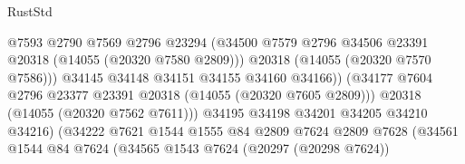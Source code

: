 \begin{lexlean}{RustStd}
\begin{coremodule}
                                              @7593
                                              @2790
                                              @7569
                                              @2796
                                              @23294
                                              (@34500
                                                @7579
                                                @2796
                                                @34506
                                                @23391
                                                @20318
                                                (@14055 (@20320 @7580 @2809)))
                                              @20318
                                              (@14055 (@20320 @7570 @7586)))
                                            @34145
                                            @34148
                                            @34151
                                            @34155
                                            @34160
                                            @34166))
                                        (@34177
                                          @7604
                                          @2796
                                          @23377
                                          @23391
                                          @20318
                                          (@14055 (@20320 @7605 @2809)))
                                        @20318
                                        (@14055 (@20320 @7562 @7611)))
                                      @34195
                                      @34198
                                      @34201
                                      @34205
                                      @34210
                                      @34216)
                                    (@34222
                                      @7621
                                      @1544
                                      @1555
                                      @84
                                      @2809
                                      @7624
                                      @2809
                                      @7628
                                      (@34561
                                        @1544
                                        @84
                                        @7624
                                        (@34565
                                          @1543
                                          @7624
                                          (@20297 (@20298 @7624))

\end{coremodule}
\end{lexlean}
